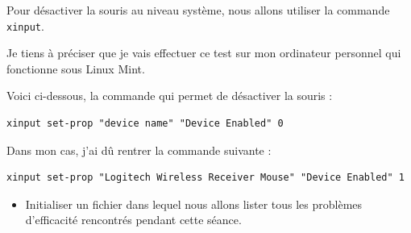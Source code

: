 \documentclass[12pt]{article}
\begin{document}
\vspace{0.3cm}

Pour désactiver la souris au niveau système, nous allons utiliser la commande \texttt{xinput}.

\vspace{0.3cm}

Je tiens à préciser que je vais effectuer ce test sur mon ordinateur personnel qui fonctionne sous Linux Mint.

\vspace{0.3cm}

Voici ci-dessous, la commande qui permet de désactiver la souris :

\begin{verbatim}
xinput set-prop "device name" "Device Enabled" 0
\end{verbatim}

Dans mon cas, j'ai dû rentrer la commande suivante :

\begin{verbatim}
xinput set-prop "Logitech Wireless Receiver Mouse" "Device Enabled" 1
\end{verbatim}

\vspace{0.3cm}

\begin{itemize}
  \item Initialiser un fichier dans lequel nous allons lister tous les problèmes d'efficacité rencontrés pendant cette séance.
\end{itemize}
\vspace{0.3cm}
\end{document}
